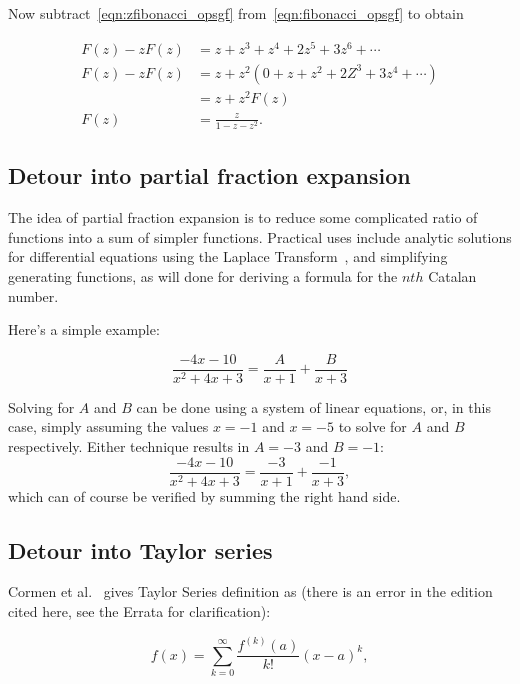 \documentclass{article}
\begin{document}
Now subtract~\ref{eqn:zfibonacci_opsgf} from~\ref{eqn:fibonacci_opsgf} to
obtain

\begin{align}
F(z) - zF(z) & = z + z^3 + z^4 + 2z^5 + 3z^6 +\cdots\\
F(z) - zF(z) & = z + z^2(0 + z + z^2 + 2Z^3 + 3z^4 +\cdots)\\
             & = z + z^2F(z)\\
        F(z) & = \frac{z}{1-z-z^2}.
\end{align}


\subsection{Detour into partial fraction expansion}

The idea of partial fraction expansion is to reduce some
complicated ratio of functions into a sum of simpler functions.
Practical uses include analytic solutions for differential equations
using the Laplace Transform~\cite[p. 347]{nagle:rk1989}, and simplifying
generating functions, as will done for deriving a formula for the
$nth$ Catalan number.

Here's a simple example:

\begin{equation}
\frac{-4x-10}{x^2+4x+3} = \frac{A}{x+1} + \frac{B}{x+3}
\end{equation}

Solving for $A$ and $B$ can be done using a system of linear equations,
or, in this case, simply assuming the values $x = -1$ and $x = -5$
to solve for $A$ and $B$ respectively. Either technique results in $A = -3$ and
$B = -1$:
\begin{equation}
\frac{-4x-10}{x^2+4x+3} = \frac{-3}{x+1} + \frac{-1}{x+3},
\end{equation}
which can of course be verified by summing the right hand side.

\subsection{Detour into Taylor series}


Cormen et al.~\cite[p. 262]{cormen:th:1990} gives Taylor Series definition as
(there is an error in the edition cited here, see the Errata for clarification):

\begin{equation}
f(x) = \sum_{k=0}^{\infty} \frac{f^{(k)}(a)}{k!}(x-a)^k,
\end{equation}
\end{document}
